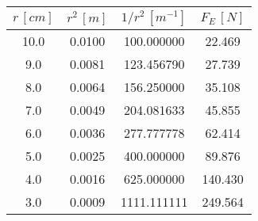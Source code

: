 \begin{tabular}{cccc}
\toprule
 $r \, [cm] $ &  $r^2\, [m]$ &  $1/r^2 \, [m^{-1}]$ &  $F_E\, [N]$ \\
\midrule
         10.0 &       0.0100 &           100.000000 &       22.469 \\
          9.0 &       0.0081 &           123.456790 &       27.739 \\
          8.0 &       0.0064 &           156.250000 &       35.108 \\
          7.0 &       0.0049 &           204.081633 &       45.855 \\
          6.0 &       0.0036 &           277.777778 &       62.414 \\
          5.0 &       0.0025 &           400.000000 &       89.876 \\
          4.0 &       0.0016 &           625.000000 &      140.430 \\
          3.0 &       0.0009 &          1111.111111 &      249.564 \\
\bottomrule
\end{tabular}
